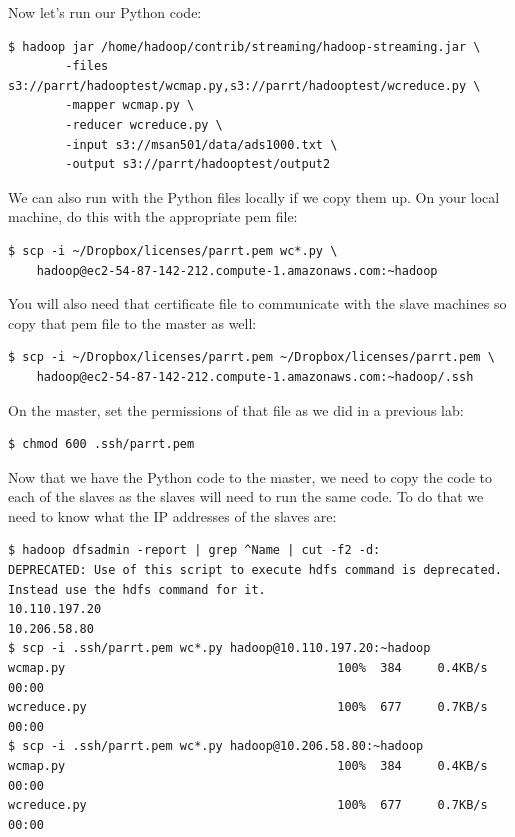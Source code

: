 \begin{fullwidth}
Now let's run our Python code:

\begin{lstlisting}[style=BashInputStyle]
$ hadoop jar /home/hadoop/contrib/streaming/hadoop-streaming.jar \
    	-files s3://parrt/hadooptest/wcmap.py,s3://parrt/hadooptest/wcreduce.py \
    	-mapper wcmap.py \
    	-reducer wcreduce.py \
    	-input s3://msan501/data/ads1000.txt \
    	-output s3://parrt/hadooptest/output2
\end{lstlisting}

\noindent We can also run with the Python files locally if we copy them up. On your local machine, do this with the appropriate pem file:

\begin{lstlisting}[style=BashInputStyle]
$ scp -i ~/Dropbox/licenses/parrt.pem wc*.py \
    hadoop@ec2-54-87-142-212.compute-1.amazonaws.com:~hadoop
\end{lstlisting}

\noindent You will also need that certificate file to communicate with the slave machines so copy that pem file to the master as well:

\begin{lstlisting}[style=BashInputStyle]
$ scp -i ~/Dropbox/licenses/parrt.pem ~/Dropbox/licenses/parrt.pem \
    hadoop@ec2-54-87-142-212.compute-1.amazonaws.com:~hadoop/.ssh
\end{lstlisting}

\noindent On the master, set the permissions of that file as we did in a previous lab:

\begin{lstlisting}[style=BashInputStyle]
$ chmod 600 .ssh/parrt.pem
\end{lstlisting}

\noindent  Now that we have the Python code to the master, we need to copy the code to each of the slaves as the slaves will need to run the same code. To do that we need to know what the IP addresses of the slaves are:

\begin{lstlisting}[style=BashInputStyle]
$ hadoop dfsadmin -report | grep ^Name | cut -f2 -d:
DEPRECATED: Use of this script to execute hdfs command is deprecated.
Instead use the hdfs command for it.
10.110.197.20
10.206.58.80
$ scp -i .ssh/parrt.pem wc*.py hadoop@10.110.197.20:~hadoop
wcmap.py                                      100%  384     0.4KB/s   00:00    
wcreduce.py                                   100%  677     0.7KB/s   00:00    
$ scp -i .ssh/parrt.pem wc*.py hadoop@10.206.58.80:~hadoop
wcmap.py                                      100%  384     0.4KB/s   00:00    
wcreduce.py                                   100%  677     0.7KB/s   00:00    
\end{lstlisting}


\end{fullwidth}
